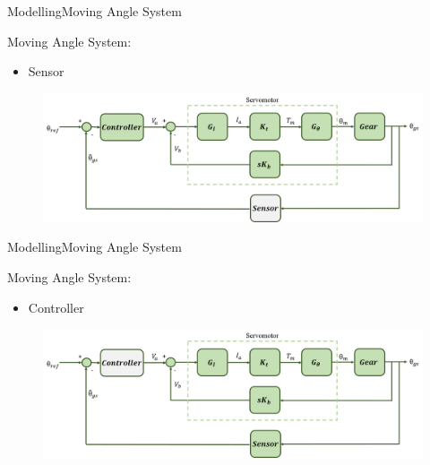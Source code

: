 \begin{frame}{Modelling}{Moving Angle System}
  \begin{block}{Moving Angle System:}

	  \begin{itemize}
	  	\item Sensor
	  \end{itemize}

	  \begin{figure}
        \includegraphics[scale=0.26]{../report/figures/servo+gear+noise+sensor.png}
      \end{figure}
  
  \end{block}
\end{frame}


\begin{frame}{Modelling}{Moving Angle System}
  \begin{block}{Moving Angle System:}
	  \begin{itemize}
	  	\item Controller
	  \end{itemize}
	  \begin{figure}
        \includegraphics[scale=0.26]{../report/figures/servo+gear+noise+controller.png}
      \end{figure}
  \end{block}
\end{frame}


